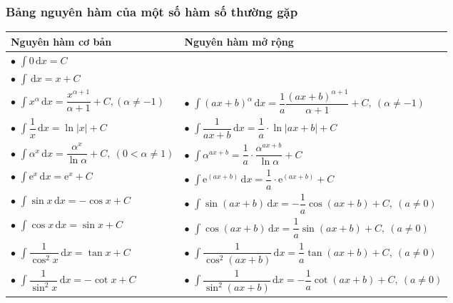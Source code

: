 \begin{khung}
\subsubsection{Bảng nguyên hàm của một số hàm số thường gặp}
\begin{longtable}{|p{6.5cm}|p{9.0cm}|}
	\hline
	\centerline{\textbf{Nguyên hàm cơ bản}}&\centerline{\textbf{Nguyên hàm mở rộng}}\\
	\hline
	\endhead
	$\bullet$	$\displaystyle\int 0\mathrm{\,d}x=C$ &\\
	$\bullet$	$\displaystyle\int  \mathrm{\,d}x = x + C$ &\\
	$\bullet$  $\displaystyle\int x^\alpha \mathrm{\,d}x = \dfrac{x^{\alpha + 1}}{\alpha + 1} +  C,\left(  \alpha \neq -1\right)$& $\bullet$ $\displaystyle\int \left(ax + b \right) ^\alpha \mathrm{\,d}x = \dfrac{1}{a}\dfrac{\left(ax + b \right) ^{\alpha + 1}}{\alpha + 1} +  C, ~ \left(  \alpha \neq -1\right)$\\		
	$\bullet$ $ \displaystyle\int \dfrac{1}{x} \mathrm{\,d}x = \ln \left| x\right| +  C$ &$\bullet$	$ \displaystyle\int \dfrac{1}{ax + b} \mathrm{\,d}x = \dfrac{1}{a} \cdot \ln \left| ax  +b\right| +  C$\\	
	$\bullet$  $ \displaystyle\int \alpha^x \mathrm{\,d}x = \dfrac{\alpha^x}{\ln \alpha}  + C,~ (0< \alpha \neq 1)$ & $\bullet$ $\displaystyle\int \alpha^{ax+b}=\dfrac{1}{a}\cdot \dfrac{\alpha^{ax+b}}{\ln \alpha}+C$\\	
	$\bullet$ $\displaystyle\int \mathrm{e}^x \mathrm{\,d}x = \mathrm{e}^x  + C$& $\bullet$ $\displaystyle\int \mathrm{e}^{\left(ax + b\right)}  \mathrm{\,d}x = \dfrac{1}{a} \cdot \mathrm{e}^{\left(ax + b \right)}  + C$\\
	$\bullet$  $\displaystyle\int \sin x \mathrm{\,d}x = -\cos x + C$ & $\bullet$ $\displaystyle\int \sin (ax + b) \mathrm{\,d}x = -\dfrac{1}{a}\cos (ax + b) +C, ~(a \neq 0)$\\
	$\bullet$  $\displaystyle\int \cos x \mathrm{\,d}x = \sin x + C$&$\bullet$  $\displaystyle\int \cos (ax + b) \mathrm{\,d}x = \dfrac{1}{a}\sin (ax + b) + C ,~ (a \neq 0)$\\
	$\bullet$ $\displaystyle\int \dfrac{1}{\cos^{2}x} \mathrm{\,d}x = \tan x + C$&  $\bullet$ $\displaystyle\int \dfrac{1}{\cos^{2}(ax + b)} \mathrm{\,d}x = \dfrac{1}{a}\tan (ax + b) + C,~ (a \neq 0)$\\
	$\bullet$  $\displaystyle\int \dfrac{1}{\sin^{2}x} \mathrm{\,d}x = -\cot x + C$&$\bullet$ $\displaystyle\int \dfrac{1}{\sin^{2}(ax + b)} \mathrm{\,d}x = -\dfrac{1}{a}\cot (ax + b) + C,~ (a \neq 0)$
	\\ 
	\hline
\end{longtable}
\end{khung}
